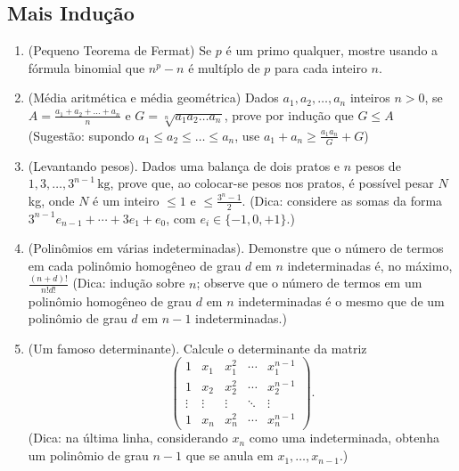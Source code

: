 \subsection{Mais Indução}

\begin{enumerate}[label=2.\arabic*.]
    
    \item (Pequeno Teorema de Fermat) Se $p$ é um primo qualquer, mostre usando a fórmula binomial 
    que $n^p - n$ é multíplo de $p$ para cada inteiro $n$.  
    
    \item (Média aritmética e média geométrica) Dados $a_1, a_2, \ldots, a_n$ inteiros $n > 0$, se 
    $A = \frac{a_1 + a_2 + \ldots + a_n}{n}$ e $G = \sqrt[n]{a_1a_2 \ldots a_n}$, prove por indução
    que $G \le A$ \\
    (Sugestão: supondo $a_1 \le a_2 \le \ldots \le a_n$, use $a_1 + a_n \ge \frac{a_1a_n}{G} + G$)
    
    \item (Levantando pesos). Dados uma balança de dois pratos e $n$ pesos de
    $1, 3, \ldots, 3^{n-1}\,\text{kg}$, prove que, ao colocar-se pesos nos
    pratos, é possível pesar $N$ kg, onde $N$ é um inteiro $\le 1$ e $\le \frac{3^n - 1}{2}$.
    (Dica: considere as somas da forma
    $3^{n-1}e_{n-1} + \cdots + 3e_1 + e_0$, com $e_i \in \{-1, 0, +1\}$.)

    \item (Polinômios em várias indeterminadas). 
    Demonstre que o número de termos em cada polinômio homogêneo de grau $d$
    em $n$ indeterminadas é, no máximo, $\frac{(n + d)!}{n!d!}$
    (Dica: indução sobre $n$; observe que o número de termos em um polinômio
    homogêneo de grau $d$ em $n$ indeterminadas é o mesmo que de um polinômio
    de grau $d$ em $n-1$ indeterminadas.)
    
    \item (Um famoso determinante). 
    Calcule o determinante da matriz
    \[
    \begin{pmatrix}
    1 & x_1 & x_1^2 & \cdots & x_1^{n-1} \\
    1 & x_2 & x_2^2 & \cdots & x_2^{n-1} \\
    \vdots & \vdots & \vdots & \ddots & \vdots \\
    1 & x_n & x_n^2 & \cdots & x_n^{n-1}
    \end{pmatrix}.
    \]
    (Dica: na última linha, considerando $x_n$ como uma indeterminada,
    obtenha um polinômio de grau $n-1$ que se anula em $x_1, \ldots, x_{n-1}$.)
    

\end{enumerate}
